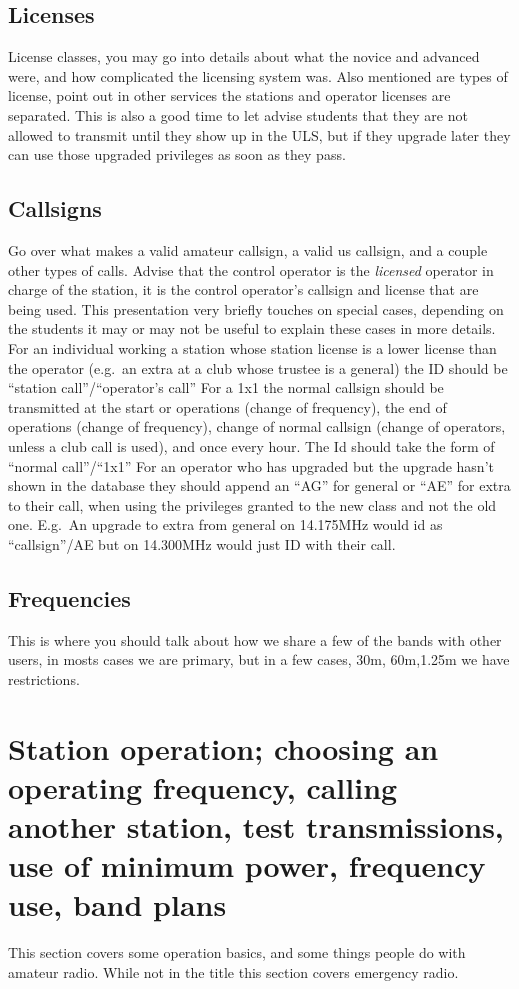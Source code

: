 \documentclass[12pt,letterpaper]{report}
\begin{document}
\subsection*{Licenses}
License classes, you may go into details about what the novice and advanced were, and how complicated the licensing system was. Also mentioned are types of license, point out in other services the stations and operator licenses are separated. This is also a good time to let advise students that they are not allowed to transmit until they show up in the ULS, but if they upgrade later they can use those upgraded privileges as soon as they pass.

\subsection*{Callsigns}
Go over what makes a valid amateur callsign, a valid us callsign, and a couple other types of calls. Advise that the control operator is the \textit{licensed} operator in charge of the station, it is the control operator's callsign and license that are being used. This presentation very briefly touches on special cases, depending on the students it may or may not be useful to explain these cases in more details.
For an individual working a station whose station license is a lower license than the operator (e.g.\ an extra at a club whose trustee is a general) the ID should be ``station call''/``operator's call''
For a 1x1 the normal callsign should be transmitted at the start or operations (change of frequency), the end of operations (change of frequency), change of normal callsign (change of operators, unless a club call is used), and once every hour. The Id should take the form of ``normal call''/``1x1''
For an operator who has upgraded but the upgrade hasn't shown in the database they should append an ``AG'' for general or ``AE'' for extra to their call, when using the privileges granted to the new class and not the old one. E.g.\ An upgrade to extra from general on 14.175MHz would id as ``callsign''/AE but on 14.300MHz would just ID with their call.

\subsection*{Frequencies}
This is where you should talk about how we share a few of the bands with other users, in mosts cases we are primary, but in a few cases, 30m, 60m,1.25m we have restrictions.

\section*{Station operation; choosing an operating frequency, calling another station, test transmissions, use of minimum power, frequency use, band plans}
This section covers some operation basics, and some things people do with amateur radio. While not in the title this section covers emergency radio.
\end{document}
